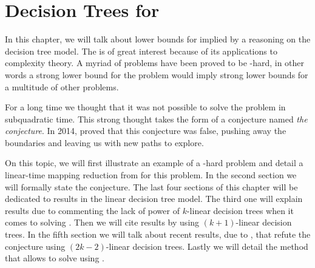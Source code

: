 \chapter{Decision Trees for \threeSUM}
\label{tree:3sum}

In this chapter, we will talk about lower bounds for \threeSUM implied by a
reasoning on the decision tree model. The \threeSUM is of great interest
because of its applications to complexity theory. A myriad of problems have
been proved to be \threeSUM-hard, in other words a strong lower bound for the
\threeSUM problem would imply strong lower bounds for a multitude of other
problems.

For a long time we thought that it was not possible to solve the \threeSUM
problem in subquadratic time. This strong thought takes the form of a
conjecture named \emph{the \threeSUM conjecture}. In 2014, \citet*{gronlund:2014}
proved that this conjecture was false, pushing away the
boundaries and leaving us with new paths to explore.

On this topic, we will first illustrate an example of a \threeSUM-hard problem
and detail a linear-time mapping reduction from \threeSUM for this problem. In
the second section we will formally state the \threeSUM conjecture. The last
four sections of this chapter will be dedicated to results in the linear
decision tree model. The third one will explain results due to
\citet*{erickson:1999} commenting the lack of power of $k$-linear decision
trees when it comes to solving \ksum. Then we will cite results by
\citet*{ailon:2005} using $(k+1)$-linear decision trees.  In the fifth section
we will talk about recent results, due to \citet*{gronlund:2014}, that refute
the \threeSUM conjecture using $(2k-2)$-linear decision trees. Lastly we will
detail the method that allows to solve \kLDT using \threeSUM.
